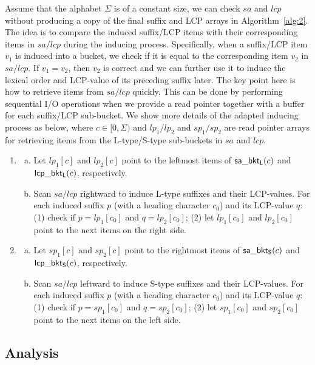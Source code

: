 \documentclass[10pt,journal,compsoc]{IEEEtran}
\begin{document}
Assume that the alphabet $\Sigma$ is of a constant size, we can check $sa$ and $lcp$ without producing a copy of the final suffix and LCP arrays in Algorithm~\ref{alg:2}. The idea is to compare the induced suffix/LCP items with their corresponding items in $sa/lcp$ during the inducing process. Specifically, when a suffix/LCP item $v_1$ is induced into a bucket, we check if it is equal to the corresponding item $v_2$ in $sa/lcp$. If $v_1 = v_2$, then $v_2$ is correct and we can further use it to induce the lexical order and LCP-value of its preceding suffix later. The key point here is how to retrieve items from $sa/lcp$ quickly. This can be done by performing sequential I/O operations when we provide a read pointer together with a buffer for each suffix/LCP sub-bucket. We show more details of the adapted inducing process as below, where $c \in [0, \Sigma)$ and $lp_1/lp_2$ and $sp_1/sp_2$ are read pointer arrays for retrieving items from the L-type/S-type sub-buckets in $sa$ and $lcp$.

\begin{enumerate}
	\item [S1]
	\begin{enumerate}[(a)]
		\item 
		Let $lp_1[c]$ and $lp_2[c]$ point to the leftmost items of ${\sf sa\_bkt_L}(c)$ and ${\sf lcp\_bkt_L}(c)$, respectively.
		\item 
		Scan $sa/lcp$ rightward to induce L-type suffixes and their LCP-values. For each induced suffix $p$ (with a heading character $c_0$) and its LCP-value $q$: (1) check if $p = lp_1[c_0]$ and $q = lp_2[c_0]$; (2) let $lp_1[c_0]$ and $lp_2[c_0]$ point to the next items on the right side.
	\end{enumerate}
	\item [S2]
	\begin{enumerate}[(a)]
		\item 	
		Let $sp_1[c]$ and $sp_2[c]$ point to the rightmost items of ${\sf sa\_bkt_S}(c)$ and ${\sf lcp\_bkt_S}(c)$, respectively.
		\item 	
		Scan $sa/lcp$ leftward to induce S-type suffixes and their LCP-values. For each induced suffix $p$ (with a heading character $c_0$) and its LCP-value $q$: (1) check if $p = sp_1[c_0]$ and $q = sp_2[c_0]$; (2) let $sp_1[c_0]$ and $sp_2[c_0]$ point to the next items on the left side.
	\end{enumerate}
\end{enumerate}


\subsection{Analysis} \label{sec:method2:analysis}
\end{document}
